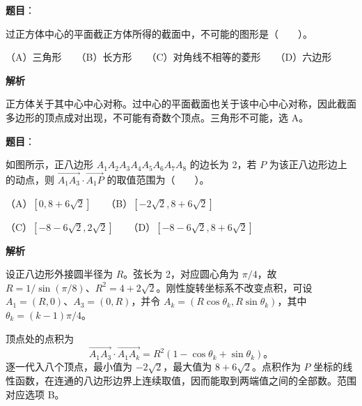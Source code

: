 \begin{answer}

\textbf{题目}：

过正方体中心的平面截正方体所得的截面中，不可能的图形是\mbox{（　　）}。

（A）三角形　　（B）长方形　　（C）对角线不相等的菱形　　（D）六边形

\textbf{解析}

正方体关于其中心中心对称。过中心的平面截面也关于该中心中心对称，因此截面多边形的顶点成对出现，不可能有奇数个顶点。三角形不可能，选 A。


\end{answer}
\begin{answer}

\textbf{题目}：

如图所示，正八边形 $A_1A_2A_3A_4A_5A_6A_7A_8$ 的边长为 2，若 $P$ 为该正八边形边上的动点，则 $\overrightarrow{A_1A_3}\cdot\overrightarrow{A_1P}$ 的取值范围为\mbox{（　　）}。
\nopagebreak[4]
\begin{center}\end{center}
\nopagebreak[4]
（A）$[0,8+6\sqrt2]$　　（B）$[-2\sqrt2,8+6\sqrt2]$

（C）$[-8-6\sqrt2,2\sqrt2]$　　（D）$[-8-6\sqrt2,8+6\sqrt2]$

\textbf{解析}

设正八边形外接圆半径为 $R$。弦长为 2，对应圆心角为 $\pi/4$，故 $R=1/\sin(\pi/8)$、$R^2=4+2\sqrt2$。刚性旋转坐标系不改变点积，可设 $A_1=(R,0)$、$A_3=(0,R)$，并令 $A_k=(R\cos\theta_k,R\sin\theta_k)$，其中 $\theta_k=(k-1)\pi/4$。

顶点处的点积为
\nopagebreak[4]
\[
\overrightarrow{A_1A_3}\cdot\overrightarrow{A_1A_k}
=R^2(1-\cos\theta_k+\sin\theta_k)\mbox{。}
\]
逐一代入八个顶点，最小值为 $-2\sqrt2$，最大值为 $8+6\sqrt2$。点积作为 $P$ 坐标的线性函数，在连通的八边形边界上连续取值，因而能取到两端值之间的全部数。范围对应选项 B。


\end{answer}
